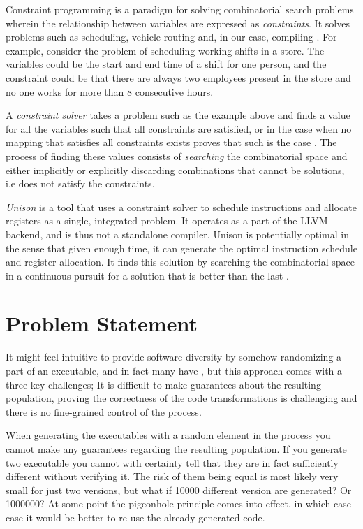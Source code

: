 Constraint programming is a paradigm for solving combinatorial search problems wherein
the relationship between variables are expressed as \textit{constraints}. It solves problems
such as scheduling, vehicle routing and, in our case, compiling
 \cite{handbook-constraint-programming, unison-docs}. For example, consider the problem
of scheduling working shifts in a store. The variables could be the start and end time
of a shift for one person, and the constraint could be that there are always two employees
present in the store and no one works for more than 8 consecutive hours.

A \textit{constraint solver} takes a problem such as the example above and finds a value
for all the variables such that all constraints are satisfied, or in the case when no
mapping that satisfies all constraints exists proves that such is the case
 \cite{handbook-constraint-programming}. The process of finding these values consists of
\textit{searching} the combinatorial space and either implicitly or explicitly discarding
combinations that cannot be solutions, i.e does not satisfy the constraints.

\textit{Unison} is a tool that uses a constraint solver to schedule instructions and allocate
registers as a single, integrated problem. It operates as a part of the LLVM backend, and
is thus not a standalone compiler. Unison is potentially optimal in the sense that given
enough time, it can generate the optimal instruction schedule and register allocation.
It finds this solution by searching the combinatorial space in a continuous pursuit for a
solution that is better than the last \cite{unison-docs}.

\section{Problem Statement}

It might feel intuitive to provide software diversity by somehow randomizing a part of an
executable, and in fact many have \cite{survey,librando,binary-stirring}, but this
approach comes with a three key challenges; It is difficult to make guarantees about the
resulting population, proving the correctness of the code transformations is challenging
and there is no fine-grained control of the process.

When generating the executables with a random element in the process you cannot make any
guarantees regarding the resulting population. If you generate two executable you cannot
with certainty tell that they are in fact sufficiently different without verifying it. The
risk of them being equal is most likely very small for just two versions, but what if
10000 different version are generated? Or 1000000? At some point the pigeonhole principle
comes into effect, in which case case it would be better to re-use the already generated
code.

